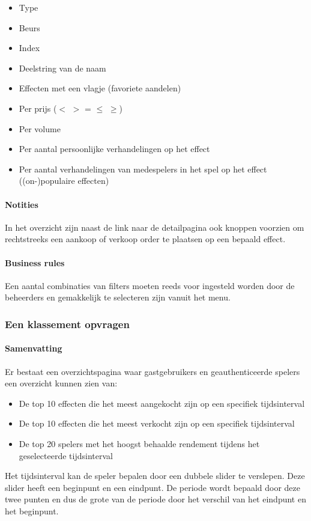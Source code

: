 \begin{itemize}
	\item Type
	\item Beurs
	\item Index
	\item Deelstring van de naam
	\item Effecten met een vlagje (favoriete aandelen)
	\item Per prijs ($<$ $>$ = $\leq$ $\geq$)
	\item Per volume
	\item Per aantal persoonlijke verhandelingen op het effect
	\item Per aantal verhandelingen van medespelers in het spel op het effect ((on-)populaire effecten)
\end{itemize}

\paragraph{Notities}In het overzicht zijn naast de link naar de detailpagina ook knoppen voorzien om rechtstreeks een aankoop of verkoop order te plaatsen op een bepaald effect.
\paragraph{Business rules}Een aantal combinaties van filters moeten reeds voor ingesteld worden door de beheerders en gemakkelijk te selecteren zijn vanuit het menu.


\subsubsection{Een klassement opvragen}

\paragraph{Samenvatting} Er bestaat een overzichtspagina waar gastgebruikers en geauthenticeerde spelers een overzicht kunnen zien van:
\begin{itemize}
	\item De top 10 effecten die het meest aangekocht zijn op een specifiek tijdsinterval
  \item De top 10 effecten die het meest verkocht zijn op een specifiek tijdsinterval
  \item De top 20 spelers met het hoogst behaalde rendement tijdens het geselecteerde tijdsinterval
\end{itemize}
Het tijdsinterval kan de speler bepalen door een dubbele slider te verslepen. Deze slider heeft een beginpunt en een eindpunt. De periode wordt bepaald door deze twee punten en dus de grote van de periode door het verschil van het eindpunt en het beginpunt.
